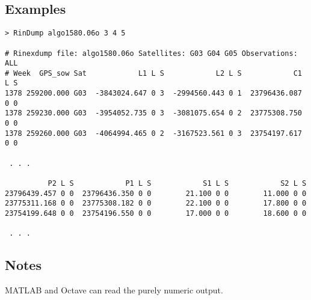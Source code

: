 \subsection{Examples}
\begin{\outputsize}
\begin{lstlisting}
> RinDump algo1580.06o 3 4 5

# Rinexdump file: algo1580.06o Satellites: G03 G04 G05 Observations: ALL
# Week  GPS_sow Sat            L1 L S            L2 L S            C1 L S
1378 259200.000 G03  -3843024.647 0 3  -2994560.443 0 1  23796436.087 0 0
1378 259230.000 G03  -3954052.735 0 3  -3081075.654 0 2  23775308.750 0 0
1378 259260.000 G03  -4064994.465 0 2  -3167523.561 0 3  23754197.617 0 0

 . . .

          P2 L S            P1 L S            S1 L S            S2 L S
23796439.457 0 0  23796436.350 0 0        21.100 0 0        11.000 0 0
23775311.168 0 0  23775308.182 0 0        22.100 0 0        17.800 0 0
23754199.648 0 0  23754196.550 0 0        17.000 0 0        18.600 0 0

 . . .
\end{lstlisting}
\end{\outputsize}

\subsection{Notes}
MATLAB and Octave can read the purely numeric output.

%
